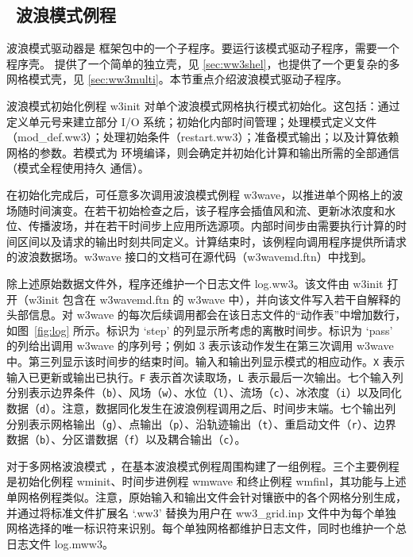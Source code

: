 \vssub
\subsection{~波浪模式例程} \label{sec:core}
\vssub

波浪模式驱动器是 \ws{} 框架包中的一个子程序。要运行该模式驱动子程序，需要一个程序壳。\ws{} 提供了一个简单的独立壳，见 \para\ref{sec:ww3shel}，也提供了一个更复杂的多网格模式壳，见 \para\ref{sec:ww3multi}。本节重点介绍波浪模式驱动子程序。

波浪模式初始化例程 {\F w3init} 对单个波浪模式网格执行模式初始化。这包括：通过定义单元号来建立部分 I/O 系统；初始化内部时间管理；处理模式定义文件（{\file mod\_def.ww3}）；处理初始条件（{\file restart.ww3}）；准备模式输出；以及计算依赖网格的参数。若模式为 \mpi{} 环境编译，则会确定并初始化计算和输出所需的全部通信（模式全程使用持久 \mpi{} 通信）。

在初始化完成后，可任意多次调用波浪模式例程 {\F w3wave}，以推进单个网格上的波场随时间演变。在若干初始检查之后，该子程序会插值风和流、更新冰浓度和水位、传播波场，并在若干时间步上应用所选源项。内部时间步由需要执行计算的时间区间以及请求的输出时刻共同定义。计算结束时，该例程向调用程序提供所请求的波浪数据场。{\F w3wave} 接口的文档可在源代码（{\file w3wavemd.ftn}）中找到。

 

除上述原始数据文件外，程序还维护一个日志文件 {\file log.ww3}。该文件由 {\F w3init} 打开（{\F w3init} 包含在 {\file w3wavemd.ftn} 的 {\F w3wave} 中），并向该文件写入若干自解释的头部信息。对 {\F w3wave} 的每次后续调用都会在该日志文件的“动作表”中增加数行，如图~\ref{fig:log} 所示。标识为 `step' 的列显示所考虑的离散时间步。标识为 `pass' 的列给出调用 {\F w3wave} 的序列号；例如 3 表示该动作发生在第三次调用 {\F w3wave} 中。第三列显示该时间步的结束时间。输入和输出列显示模式的相应动作。{\tt X} 表示输入已更新或输出已执行。{\tt F} 表示首次读取场，{\tt L} 表示最后一次输出。七个输入列分别表示边界条件（{\tt b}）、风场（{\tt w}）、水位（{\tt l}）、流场（{\tt c}）、冰浓度（{\tt i}）以及同化数据（{\tt d}）。注意，数据同化发生在波浪例程调用之后、时间步末端。七个输出列分别表示网格输出（{\tt g}）、点输出（{\tt p}）、沿轨迹输出（{\tt t}）、重启动文件（{\tt r}）、边界数据（{\tt b}）、分区谱数据（{\tt f}）以及耦合输出（{\tt c}）。

对于多网格波浪模式 \citep[][{\file ww3\_multi}]{tol:OMOD08b}，在基本波浪模式例程周围构建了一组例程。三个主要例程是初始化例程 {\F wminit}、时间步进例程 {\F wmwave} 和终止例程 {\F wmfinl}，其功能与上述单网格例程类似。注意，原始输入和输出文件会针对镶嵌中的各个网格分别生成，并通过将标准文件扩展名 `{\file .ww3}' 替换为用户在 {\file ww3\_grid.inp} 文件中为每个单独网格选择的唯一标识符来识别。每个单独网格都维护日志文件，同时也维护一个总日志文件 {\file log.mww3}。
